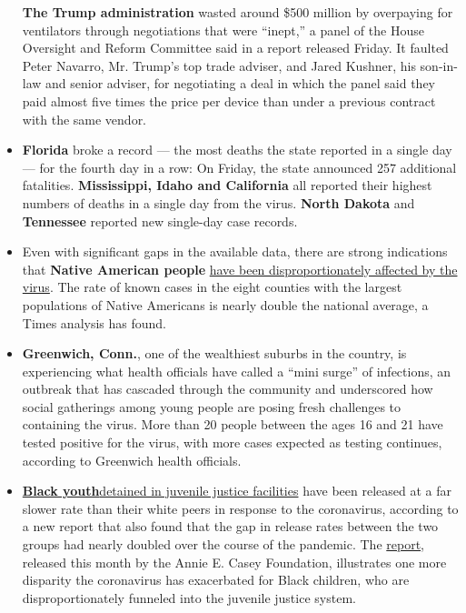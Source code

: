 \begin{itemize}
  \textbf{The Trump administration} wasted around \$500 million by
  overpaying for ventilators through negotiations that were ``inept,'' a
  panel of the House Oversight and Reform Committee said in a report
  released Friday. It faulted Peter Navarro, Mr. Trump's top trade
  adviser, and Jared Kushner, his son-in-law and senior adviser, for
  negotiating a deal in which the panel said they paid almost five times
  the price per device than under a previous contract with the same
  vendor.
\item
  \textbf{Florida} broke a record --- the most deaths the state reported
  in a single day --- for the fourth day in a row: On Friday, the state
  announced 257 additional fatalities. \textbf{Mississippi, Idaho and
  California} all reported their highest numbers of deaths in a single
  day from the virus. \textbf{North Dakota} and \textbf{Tennessee}
  reported new single-day case records.
\item
  Even with significant gaps in the available data, there are strong
  indications that \textbf{Native American people}
  \href{https://www.nytimes3xbfgragh.onion/2020/07/30/us/native-americans-coronavirus-data.html}{have
  been disproportionately affected by the virus}. The rate of known
  cases in the eight counties with the largest populations of Native
  Americans is nearly double the national average, a Times analysis has
  found.
\item
  \textbf{Greenwich, Conn.}, one of the wealthiest suburbs in the
  country, is experiencing what health officials have called a ``mini
  surge'' of infections, an outbreak that has cascaded through the
  community and underscored how social gatherings among young people are
  posing fresh challenges to containing the virus. More than 20 people
  between the ages 16 and 21 have tested positive for the virus, with
  more cases expected as testing continues, according to Greenwich
  health officials.
\item
  \textbf{\href{https://www.nytimes3xbfgragh.onion/2020/07/30/us/politics/juvenile-detainees-coronavirus.html}{Black
  youth}}\href{https://www.nytimes3xbfgragh.onion/2020/07/30/us/politics/juvenile-detainees-coronavirus.html}{detained
  in juvenile justice facilities} have been released at a far slower
  rate than their white peers in response to the coronavirus, according
  to a new report that also found that the gap in release rates between
  the two groups had nearly doubled over the course of the pandemic. The
  \href{https://www.aecf.org/blog/youth-detention-admissions-remain-low-but-releases-stall-despite-covid-19/}{report},
  released this month by the Annie E. Casey Foundation, illustrates one
  more disparity the coronavirus has exacerbated for Black children, who
  are disproportionately funneled into the juvenile justice system.
\end{itemize}

